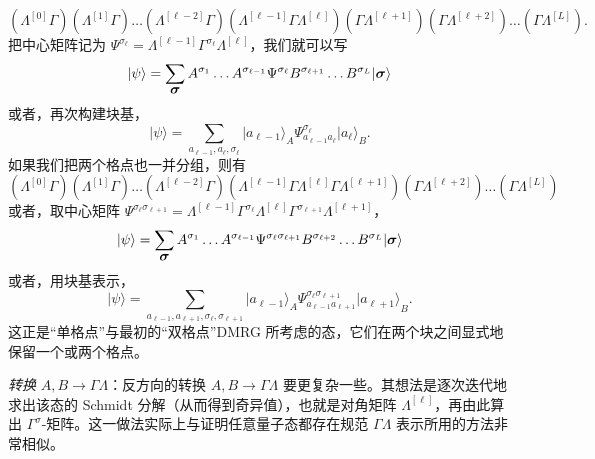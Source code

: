 \documentclass[a4paper,10pt,oneside,onecolumn,1p,times]{elsarticle}
\newcommand{\ket}[1]{\mbox{$| #1  \rangle$}}
\newcommand{\fat}[1]{\mbox{\boldmath$#1$\unboldmath}}	%
\begin{document}
\begin{equation}
(\Lambda^{[0]}\Gamma)(\Lambda^{[1]}\Gamma)\ldots(\Lambda^{[\ell-2]}\Gamma)(\Lambda^{[\ell-1]}\Gamma \Lambda^{[\ell]}) (\Gamma\Lambda^{[\ell+1]})(\Gamma\Lambda^{[\ell+2]}) \ldots (\Gamma\Lambda^{[L]}) .
\end{equation}
把中心矩阵记为 $\Psi^{\sigma_\ell}= \Lambda^{[\ell-1]}\Gamma^{\sigma_\ell} \Lambda^{[\ell]}$，我们就可以写
\begin{equation}
\ket{\psi} = \sum_{\fat{\sigma}} A^{\sigma_1} \ldots A^{\sigma_{\ell-1}} \Psi^{\sigma_\ell} B^{\sigma_{\ell+1}} \ldots B^{\sigma_L}
\ket{\fat{\sigma}}
\end{equation}
或者，再次构建块基，
\begin{equation}
\ket{\psi} = \sum_{a_{\ell-1},a_{\ell},\sigma_\ell} \ket{a_{\ell-1}}_A \Psi^{\sigma_\ell}_{a_{\ell-1}a_\ell} \ket{a_\ell}_B .
\end{equation}
如果我们把两个格点也一并分组，则有
\begin{equation}
(\Lambda^{[0]}\Gamma)(\Lambda^{[1]}\Gamma)\ldots(\Lambda^{[\ell-2]}\Gamma)(\Lambda^{[\ell-1]}\Gamma \Lambda^{[\ell]} \Gamma\Lambda^{[\ell+1]})(\Gamma\Lambda^{[\ell+2]}) \ldots (\Gamma\Lambda^{[L]}) 
\end{equation}
或者，取中心矩阵 $\Psi^{\sigma_\ell \sigma_{\ell+1}}=\Lambda^{[\ell-1]}\Gamma^{\sigma_\ell} \Lambda^{[\ell]} \Gamma^{\sigma_{\ell+1}}\Lambda^{[\ell+1]}$，
\begin{equation}
\ket{\psi} = \sum_{\fat{\sigma}} A^{\sigma_1} \ldots A^{\sigma_{\ell-1}} \Psi^{\sigma_\ell \sigma_{\ell+1}} B^{\sigma_{\ell+2}} \ldots B^{\sigma_L} \ket{\fat{\sigma}}
\end{equation}
或者，用块基表示，
\begin{equation}
\ket{\psi} = \sum_{a_{\ell-1},a_{\ell+1},\sigma_\ell,\sigma_{\ell+1}} \ket{a_{\ell-1}}_A \Psi^{\sigma_\ell \sigma_{\ell+1}}_{a_{\ell-1}a_{\ell+1}} \ket{a_{\ell+1}}_B .
\end{equation}
这正是``单格点''与最初的``双格点''DMRG 所考虑的态，它们在两个块之间显式地保留一个或两个格点。

{\em 转换} $A,B \rightarrow \Gamma\Lambda$：反方向的转换 $A,B \rightarrow \Gamma\Lambda$ 要更复杂一些。其想法是逐次迭代地求出该态的 Schmidt 分解（从而得到奇异值），也就是对角矩阵 $\Lambda^{[\ell]}$，再由此算出 $\Gamma^{\sigma}$-矩阵。这一做法实际上与证明任意量子态都存在规范 $\Gamma\Lambda$ 表示所用的方法非常相似。
\end{document}
